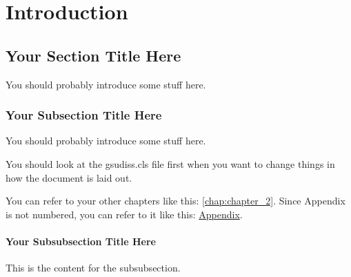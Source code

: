 \chapter{Introduction}
\label{chap:introduction}

\section{Your Section Title Here}
	You should probably introduce some stuff here.

\subsection{Your Subsection Title Here}
You should probably introduce some stuff here.

You should look at the gsudiss.cls file first when you want to change things in how the document is laid out. 

You can refer to your other chapters like this: \chap\ref{chap:chapter_2}. Since Appendix is not numbered, you can refer to it like this: \hyperref[chap:appendix]{Appendix}.

\subsubsection{Your Subsubsection Title Here}
This is the content for the subsubsection.

\lipsum[1-5]
